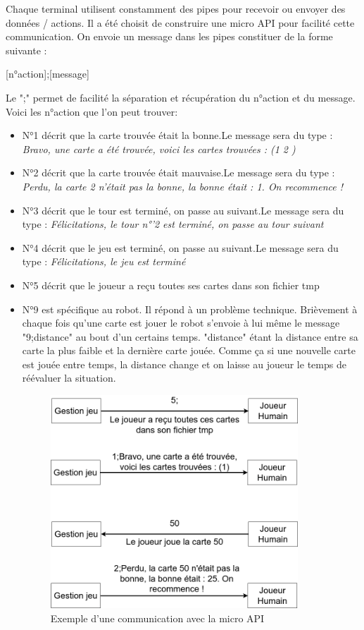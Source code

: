 \documentclass{article}
\begin{document}
Chaque terminal utilisent constamment des pipes pour recevoir ou envoyer des données / actions. Il a été choisit de construire une micro API pour facilité cette communication. On envoie un message dans les pipes constituer de la forme suivante :
\begin{center}
[n°action];[message]
\end{center}
Le ";" permet de facilité la séparation et récupération du n°action et du message. Voici les n°action que l'on peut trouver:
\begin{itemize}
	\item N°1 décrit que la carte trouvée était la bonne.\newline Le message sera du type : \textit{Bravo, une carte a été trouvée, voici les cartes trouvées : (1 2 )}
	\item N°2 décrit que la carte trouvée était mauvaise.\newline Le message sera du type : \textit{Perdu, la carte 2 n'était pas la bonne, la bonne était : 1. On recommence !}  
	\item N°3 décrit que le tour est terminé, on passe au suivant.\newline Le message sera du type : \textit{Félicitations, le tour n°'2 est terminé, on passe au tour suivant} 
	\item N°4 décrit que le jeu est terminé, on passe au suivant.\newline Le message sera du type : \textit{Félicitations, le jeu est terminé}
	\item N°5 décrit que le joueur a reçu toutes ses cartes dans son fichier tmp     
	\item N°9 est spécifique au robot. Il répond à un problème technique. Brièvement à chaque fois qu'une carte est jouer le robot s'envoie à lui même le message "9;distance" au bout d'un certains temps. "distance" étant la distance entre sa carte la plus faible et la dernière carte jouée. Comme ça si une nouvelle carte est jouée entre temps, la distance change et on laisse au joueur le temps de réévaluer la situation.
	
\begin{figure}[!htb]
	\centering
    	\includegraphics[height=8cm]{./assets/pipe_com.png}
    	\caption{
	    	Exemple d'une communication avec la micro API
    	}
    	\label{fig:pipe}
\end{figure}


\end{itemize}
\end{document}
